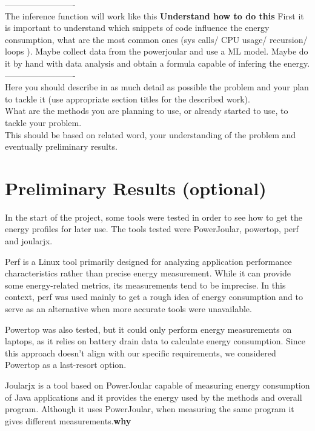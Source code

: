 \documentclass[sigplan]{acmart}
\begin{document}
-------------------------\\
The inference function will work like this \textbf{Understand how to do this}
First it is important to understand which snippets of code influence the energy consumption, what are the most common ones (sys calls/ CPU usage/ recursion/ loops ).
Maybe collect data from the powerjoular and use a ML model.
Maybe do it by hand with data analysis and obtain a formula capable of infering the energy.
-------------------------\\





Here you should describe in as much detail as possible the problem and your plan to tackle it (use appropriate section titles for the described work). \\

What are the methods you are planning to use, or already started to use, to tackle your problem. \\

This should be based on related word, your understanding of the problem and eventually preliminary results.

\section{Preliminary Results (optional)} \label{sec:preliminaryresults}

In the start of the project, some tools were tested in order to see how to get the energy profiles for later use. The tools tested were PowerJoular, powertop, perf and joularjx.

Perf is a Linux tool primarily designed for analyzing application performance characteristics rather than precise energy measurement. While it can provide some energy-related metrics, its measurements tend to be imprecise. In this context, perf was used mainly to get a rough idea of energy consumption and to serve as an alternative when more accurate tools were unavailable.

Powertop was also tested, but it could only perform energy measurements on laptops, as it relies on battery drain data to calculate energy consumption. Since this approach doesn't align with our specific requirements, we considered Powertop as a last-resort option.

Joularjx is a tool based on PowerJoular capable of measuring energy consumption of Java applications and it provides the energy used by the methods and overall program. Although it uses PowerJoular, when measuring the same program it gives different measurements.\textbf{why}
\end{document}
